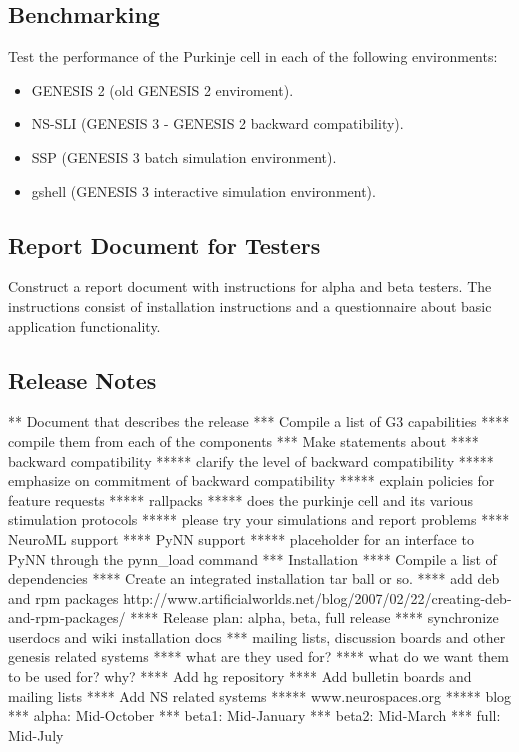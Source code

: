 \documentclass[12pt]{article}
\begin{document}
\subsection{Benchmarking}

Test the performance of the Purkinje cell in each of the following
environments:

\begin{itemize}
\item GENESIS 2 (old GENESIS 2 enviroment).
\item NS-SLI (GENESIS 3 - GENESIS 2 backward compatibility).
\item SSP (GENESIS 3 batch simulation environment).
\item gshell (GENESIS 3 interactive simulation environment).
\end{itemize}


\subsection{Report Document for Testers}

Construct a report document with instructions for alpha and beta
testers.  The instructions consist of installation instructions and a
questionnaire about basic application functionality.


\subsection{Release Notes}

** Document that describes the release
*** Compile a list of G3 capabilities
**** compile them from each of the components
*** Make statements about
**** backward compatibility
***** clarify the level of backward compatibility 
***** emphasize on commitment of backward compatibility
***** explain policies for feature requests
***** rallpacks
***** does the purkinje cell and its various stimulation protocols
***** please try your simulations and report problems
**** NeuroML support
**** PyNN support
***** placeholder for an interface to PyNN through the pynn\_load command
*** Installation
**** Compile a list of dependencies
**** Create an integrated installation tar ball or so.
**** add deb and rpm packages
http://www.artificialworlds.net/blog/2007/02/22/creating-deb-and-rpm-packages/
**** Release plan: alpha, beta, full release
**** synchronize userdocs and wiki installation docs
*** mailing lists, discussion boards and other genesis related systems
**** what are they used for?
**** what do we want them to be used for? why?
**** Add hg repository
**** Add bulletin boards and mailing lists
**** Add NS related systems
***** www.neurospaces.org
***** blog
*** alpha: Mid-October
*** beta1: Mid-January
*** beta2: Mid-March
*** full: Mid-July
\end{document}
